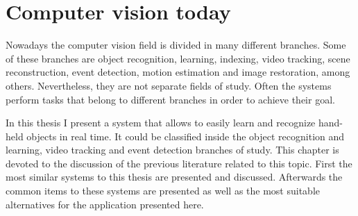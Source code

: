 \section{Computer vision today}

Nowadays the computer vision field is divided in many different branches. 
Some of these branches are object recognition, learning, indexing, video tracking, scene reconstruction, event detection, motion estimation and image restoration, among others. 
Nevertheless, they are not separate fields of study. 
Often the systems perform tasks that belong to different branches in order to achieve their goal. 

In this thesis I present a system that allows to easily learn and recognize hand-held objects in real time. 
It could be classified inside the object recognition and learning, video tracking and event detection branches of study. 
This chapter is devoted to the discussion of the previous literature related to this topic. 
First the most similar systems to this thesis are presented and discussed. 
Afterwards the common items to these systems are presented as well as the most suitable alternatives for the application presented here. 



